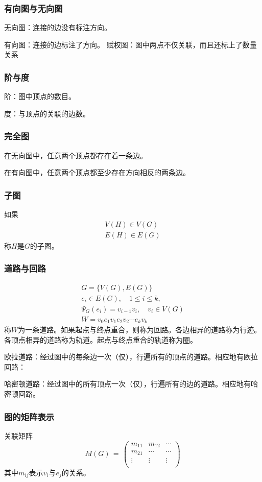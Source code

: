 \subsubsection{有向图与无向图}
无向图：连接的边没有标注方向。\par
有向图：连接的边标注了方向。
赋权图：图中两点不仅关联，而且还标上了数量关系
\subsubsection{阶与度}
阶：图中顶点的数目。\par
度：与顶点的关联的边数。
\subsubsection{完全图}
在无向图中，任意两个顶点都存在着一条边。 \par
在有向图中，任意两个顶点都至少存在方向相反的两条边。
\subsubsection{子图}
如果
\begin{align*}
V(H) \in V(G) \\
E(H) \in E(G)
\end{align*}
称$H$是$G$的子图。
\subsubsection{道路与回路}
\begin{align*}
G=\{V(G),E(G)\} \\
e_i\in E(G),\quad 1\leq i\leq k,\\
\Psi_G(e_i)=v_{i-1}v_i,\quad v_i\in V(G) \\
W=v_0e_1v_1e_2v_2\cdots e_kv_k
\end{align*}
称$W$为一条道路。如果起点与终点重合，则称为回路。各边相异的道路称为行迹。各顶点相异的道路称为轨道。起点与终点重合的轨道称为圈。\par
欧拉道路：经过图中的每条边一次（仅），行遍所有的顶点的道路。相应地有欧拉回路：\par
哈密顿道路：经过图中的所有顶点一次（仅），行遍所有的边的道路。相应地有哈密顿回路。

\subsubsection{图的矩阵表示}
关联矩阵
\begin{equation*}
M(G)\,=\,\left(
\begin{matrix}
m_{11} & m_{12} & \cdots \\
m_{21} & \cdots & \cdots \\
\vdots & \vdots & \vdots \\
\end{matrix}
\right)
\end{equation*}
其中$m_{ij}$表示$v_i$与$e_j$的关系。

